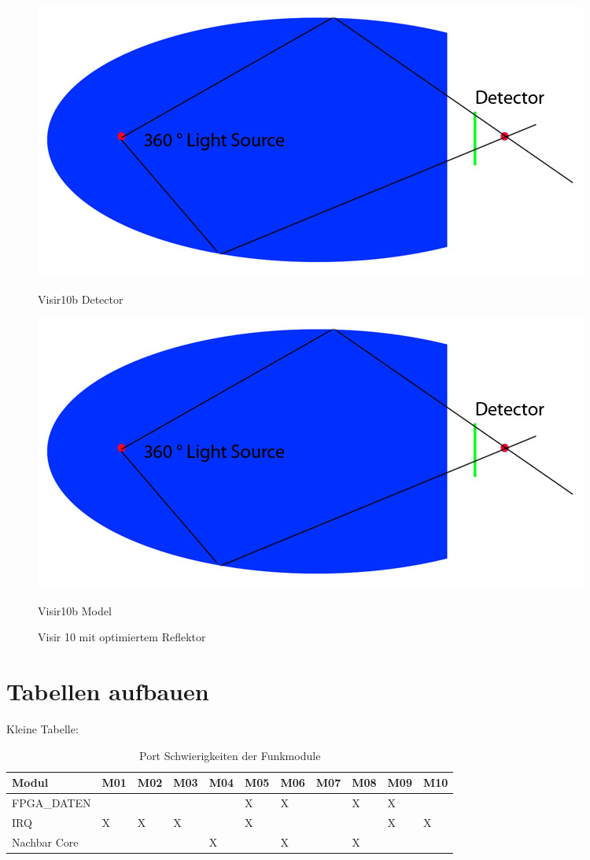 \begin{figure}[H]
  \centering
  \begin{minipage}[b]{0.45\textwidth}
    \includegraphics[scale=0.15]{images/photoshop/Skizze.jpg}
    \caption{Visir10b Detector}
    \label{Visir10bDetector} 
  \end{minipage} %
  \begin{minipage}[b]{0.45\textwidth}
    \includegraphics[scale=0.15]{images/photoshop/Skizze.jpg} 
    \caption{Visir10b Model}
    \label{Visir10bModel} 
  \end{minipage}
  \caption{Visir 10 mit optimiertem Reflektor}
  \label{fig.Visir10b}
\end{figure}


\section{Tabellen aufbauen}\label{tabelle}
Kleine Tabelle:

\begin{table}[ht] \centering
	\caption{Port Schwierigkeiten der Funkmodule}
	\begin{tabular}{|p{3cm}|p{.5cm}|p{.5cm}|p{.5cm}|p{.5cm}|p{.5cm}|p{.5cm}|p{.5cm}|p{.5cm}|p{.5cm}|p{.5cm}|} \hline
		\rowcolor{gray} Modul & M01 & M02 & M03 & M04 & M05 & M06 & M07 & M08 & M09 & M10 \\
		\hline
		FPGA\_DATEN & & & & & X & X & & X & X & \\
		\hline
		IRQ & X & X & X & & X & & & & X & X \\
		\hline
		Nachbar Core & & & & X & & X & & X & & \\
		\hline
	\end{tabular}
	\label{tab:portprobleme}
 \end{table}	

